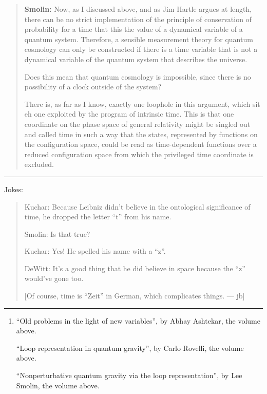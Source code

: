 \documentclass{article}
\begin{document}
\begin{quote}
\textbf{Smolin:} Now, as I discussed above, and as Jim Hartle argues at
length, there can be no strict implementation of the principle of
conservation of probability for a time that this the value of a
dynamical variable of a quantum system. Therefore, a sensible
measurement theory for quantum cosmology can only be constructed if
there is a time variable that is not a dynamical variable of the quantum
system that describes the universe.

Does this mean that quantum cosmology is impossible, since there is no
possibility of a clock outside of the system?

There is, as far as I know, exactly one loophole in this argument, which
sit eh one exploited by the program of intrinsic time. This is that one
coordinate on the phase space of general relativity might be singled out
and called time in such a way that the states, represented by functions
on the configuration space, could be read as time-dependent functions
over a reduced configuration space from which the privileged time
coordinate is excluded.
\end{quote}

\begin{center}\rule{0.5\linewidth}{0.5pt}\end{center}

Jokes:

\begin{quote}
Kuchar: Because Leibniz didn't believe in the ontological significance
of time, he dropped the letter ``t'' from his name.

Smolin: Is that true?

Kuchar: Yes! He spelled his name with a ``z''.

DeWitt: It's a good thing that he did believe in space because the ``z''
would've gone too.

{[}Of course, time is ``Zeit'' in German, which complicates things. ---
jb{]}
\end{quote}

\begin{center}\rule{0.5\linewidth}{0.5pt}\end{center}

\begin{enumerate}
\def\labelenumi{\arabic{enumi})}
\setcounter{enumi}{3}
\item
  ``Old problems in the light of new variables'', by Abhay Ashtekar, the
  volume above.

  ``Loop representation in quantum gravity'', by Carlo Rovelli, the
  volume above.

  ``Nonperturbative quantum gravity via the loop representation'', by
  Lee Smolin, the volume above.
\end{enumerate}
\end{document}
